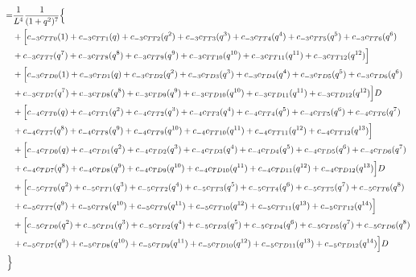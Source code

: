 \documentclass[12pt]{article}
\begin{document}
\begin{align}
    =& \frac{1}{L^4} \frac{1}{(1+q^2)^7} \Bigl\{ \nonumber\\
    &+ \Bigl[ c_{-3}c_{TT0}(1) + c_{-3}c_{TT1}(q) + c_{-3}c_{TT2}(q^2) + c_{-3}c_{TT3}(q^3) + c_{-3}c_{TT4}(q^4) + c_{-3}c_{TT5}(q^5) + c_{-3}c_{TT6}(q^6) \nonumber\\
    &+ c_{-3}c_{TT7}(q^7) + c_{-3}c_{TT8}(q^8) + c_{-3}c_{TT9}(q^9) + c_{-3}c_{TT10}(q^{10}) + c_{-3}c_{TT11}(q^{11}) + c_{-3}c_{TT12}(q^{12}) \Bigr] \nonumber\\
    &+ \Bigl[ c_{-3}c_{TD0}(1) + c_{-3}c_{TD1}(q) + c_{-3}c_{TD2}(q^2) + c_{-3}c_{TD3}(q^3) + c_{-3}c_{TD4}(q^4) + c_{-3}c_{TD5}(q^5) + c_{-3}c_{TD6}(q^6) \nonumber\\
    &+ c_{-3}c_{TD7}(q^7) + c_{-3}c_{TD8}(q^8) + c_{-3}c_{TD9}(q^9) + c_{-3}c_{TD10}(q^{10}) + c_{-3}c_{TD11}(q^{11}) + c_{-3}c_{TD12}(q^{12}) \Bigr]D  \nonumber\\
    &+ \Bigl[ c_{-4}c_{TT0}(q) + c_{-4}c_{TT1}(q^2) + c_{-4}c_{TT2}(q^3) + c_{-4}c_{TT3}(q^4) + c_{-4}c_{TT4}(q^5) + c_{-4}c_{TT5}(q^6) + c_{-4}c_{TT6}(q^7) \nonumber\\
    &+ c_{-4}c_{TT7}(q^8) + c_{-4}c_{TT8}(q^9) + c_{-4}c_{TT9}(q^{10}) + c_{-4}c_{TT10}(q^{11}) + c_{-4}c_{TT11}(q^{12}) + c_{-4}c_{TT12}(q^{13}) \Bigr] \nonumber\\
    &+ \Bigl[ c_{-4}c_{TD0}(q) + c_{-4}c_{TD1}(q^2) + c_{-4}c_{TD2}(q^3) + c_{-4}c_{TD3}(q^4) + c_{-4}c_{TD4}(q^5) + c_{-4}c_{TD5}(q^6) + c_{-4}c_{TD6}(q^7) \nonumber\\
    &+ c_{-4}c_{TD7}(q^8) + c_{-4}c_{TD8}(q^9) + c_{-4}c_{TD9}(q^{10}) + c_{-4}c_{TD10}(q^{11}) + c_{-4}c_{TD11}(q^{12}) + c_{-4}c_{TD12}(q^{13}) \Bigr]D   \nonumber\\
    &+ \Bigl[ c_{-5}c_{TT0}(q^2) + c_{-5}c_{TT1}(q^3) + c_{-5}c_{TT2}(q^4) + c_{-5}c_{TT3}(q^5) + c_{-5}c_{TT4}(q^6) + c_{-5}c_{TT5}(q^7) + c_{-5}c_{TT6}(q^8) \nonumber\\
    &+ c_{-5}c_{TT7}(q^9) + c_{-5}c_{TT8}(q^{10}) + c_{-5}c_{TT9}(q^{11}) + c_{-5}c_{TT10}(q^{12}) + c_{-5}c_{TT11}(q^{13}) + c_{-5}c_{TT12}(q^{14}) \Bigr] \nonumber\\
    &+ \Bigl[ c_{-5}c_{TD0}(q^2) + c_{-5}c_{TD1}(q^3) + c_{-5}c_{TD2}(q^4) + c_{-5}c_{TD3}(q^5) + c_{-5}c_{TD4}(q^6) + c_{-5}c_{TD5}(q^7) + c_{-5}c_{TD6}(q^8) \nonumber\\
    &+ c_{-5}c_{TD7}(q^9) + c_{-5}c_{TD8}(q^{10}) + c_{-5}c_{TD9}(q^{11}) + c_{-5}c_{TD10}(q^{12}) + c_{-5}c_{TD11}(q^{13}) + c_{-5}c_{TD12}(q^{14}) \Bigr]D   \nonumber\\
    \Bigr\}
\end{align}
\end{document}
